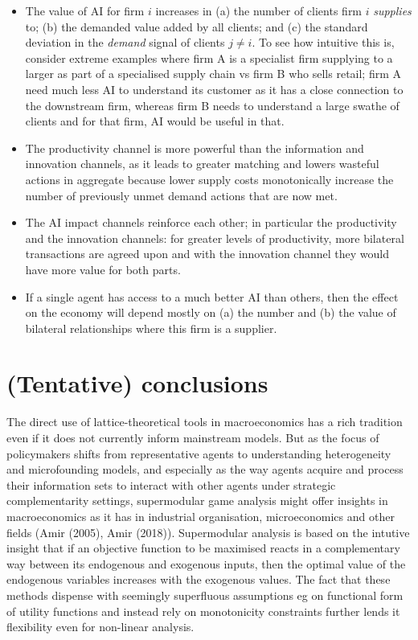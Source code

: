 \documentclass[
]{article}
\theoremstyle{definition}
\theoremstyle{plain}
\theoremstyle{remark}
\begin{document}
\begin{itemize}
\item
  The value of AI for firm \(i\) increases in (a) the number of clients
  firm \(i\) \emph{supplies} to; (b) the demanded value added by all
  clients; and (c) the standard deviation in the \emph{demand} signal of
  clients \(j \neq i\). To see how intuitive this is, consider extreme
  examples where firm A is a specialist firm supplying to a larger as
  part of a specialised supply chain vs firm B who sells retail; firm A
  need much less AI to understand its customer as it has a close
  connection to the downstream firm, whereas firm B needs to understand
  a large swathe of clients and for that firm, AI would be useful in
  that.
\item
  The productivity channel is more powerful than the information and
  innovation channels, as it leads to greater matching and lowers
  wasteful actions in aggregate because lower supply costs monotonically
  increase the number of previously unmet demand actions that are now
  met.
\item
  The AI impact channels reinforce each other; in particular the
  productivity and the innovation channels: for greater levels of
  productivity, more bilateral transactions are agreed upon and with the
  innovation channel they would have more value for both parts.
\item
  If a single agent has access to a much better AI than others, then the
  effect on the economy will depend mostly on (a) the number and (b) the
  value of bilateral relationships where this firm is a supplier.
\end{itemize}

\section{(Tentative) conclusions}\label{tentative-conclusions}

The direct use of lattice-theoretical tools in macroeconomics has a rich
tradition even if it does not currently inform mainstream models. But as
the focus of policymakers shifts from representative agents to
understanding heterogeneity and microfounding models, and especially as
the way agents acquire and process their information sets to interact
with other agents under strategic complementarity settings, supermodular
game analysis might offer insights in macroeconomics as it has in
industrial organisation, microeconomics and other fields (Amir (2005),
Amir (2018)). Supermodular analysis is based on the intutive insight
that if an objective function to be maximised reacts in a complementary
way between its endogenous and exogenous inputs, then the optimal value
of the endogenous variables increases with the exogenous values. The
fact that these methods dispense with seemingly superfluous assumptions
eg on functional form of utility functions and instead rely on
monotonicity constraints further lends it flexibility even for
non-linear analysis.
\end{document}
